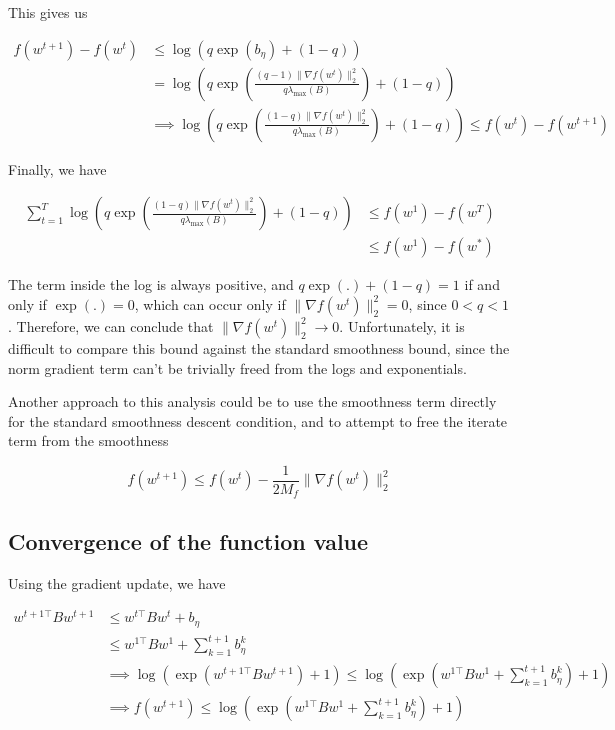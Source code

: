 \documentclass[11pt]{article}
\begin{document}
This gives us

\begin{align*}
    f(w^{t+1}) - f(w^t) &\leq \log( q \exp(b_\eta ) + (1 - q)) \\
    &= \log \left( q \exp \left( \frac{(q-1) \| \nabla f(w^t) \|_2^2}{q \lambda_{\max}(B)} \right) + (1 - q) \right) \\
    &\implies \log \left( q \exp \left( \frac{(1-q) \| \nabla f(w^t) \|_2^2}{q \lambda_{\max}(B)} \right) + (1-q) \right) \leq f(w^t) - f(w^{t+1}) 
\end{align*}

Finally, we have

\begin{align*}
    \sum_{t=1}^{T} \log \left( q \exp \left( \frac{(1-q) \| \nabla f(w^t) \|_2^2}{q \lambda_{\max}(B)} \right) + (1-q) \right) &\leq f(w^1) - f(w^{T}) \\
    &\leq f(w^1) - f(w^{*})
\end{align*}

The term inside the log is always positive, and $q \exp(.) + (1-q) = 1$ if and only if $\exp(.) = 0$, which can occur only if $\| \nabla f(w^t) \|_2^2 = 0$, since $0 < q < 1$. Therefore, we can conclude that $\| \nabla f(w^t) \|_2^2 \rightarrow 0$. Unfortunately, it is difficult to compare this bound against the standard smoothness bound, since the norm gradient term can't be trivially freed from the logs and exponentials.

Another approach to this analysis could be to use the smoothness term directly for the standard smoothness descent condition, and to attempt to free the iterate term from the smoothness

\begin{equation}
    f(w^{t+1}) \leq f(w^t) - \frac{1}{2M_f}\| \nabla f(w^t) \|_2^2
\end{equation}

\subsection{Convergence of the function value}

Using the gradient update, we have

\begin{align*}
    w^{t+1\top}Bw^{t+1} &\leq w^{t\top}Bw^{t} + b_\eta \\
    &\leq w^{1\top}Bw^{1} + \sum_{k=1}^{t+1} b_\eta^k \\
    &\implies \log( \exp(w^{t+1\top}Bw^{t+1}) + 1) \leq \log( \exp(w^{1\top}Bw^{1} + \sum_{k=1}^{t+1} b_\eta^k) + 1) \\
    &\implies f(w^{t+1}) \leq \log( \exp(w^{1\top}Bw^{1} + \sum_{k=1}^{t+1} b_\eta^k) + 1)
\end{align*}
\end{document}
